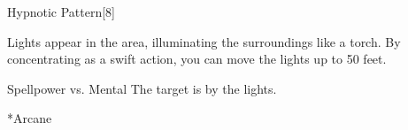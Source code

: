 \begin{spellsection}[Greater]{Hypnotic Pattern}[8]
    \begin{spellheader}
    \end{spellheader}
    \begin{spellcontent}
        \begin{spelltargetinginfo}
        \end{spelltargetinginfo}
        \begin{spelleffects}
            \spelleffect Lights appear in the area, illuminating the surroundings like a torch. By concentrating as a swift action, you can move the lights up to 50 feet.
            \spelldur \durmed
        \end{spelleffects}
    \end{spellcontent}
    \begin{spellsubcontent}
        \begin{spelltargetinginfo}
        \end{spelltargetinginfo}
        \begin{spelleffects}
            \begin{spellattack}{Spellpower vs. Mental}
                \spellsuccess The target is \fascinated by the lights.
            \end{spellattack}
        \end{spelleffects}
    \end{spellsubcontent}
    \begin{spellfooter}
        *{Arcane}
        \miscastyou
    \end{spellfooter}
\end{spellsection}


